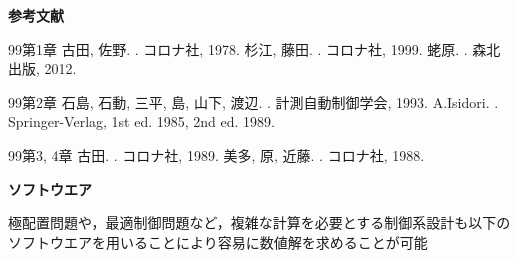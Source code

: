 \begin{center}
{\LARGE \bf 参考文献}
\end{center}

\begin{thebibliography}{99}{第1章}
  古田, 佐野.
	 .
	 \newblock コロナ社, 1978.
  杉江, 藤田.
	 .
	 \newblock コロナ社, 1999.
  蛯原.
	 .
	 \newblock 森北出版, 2012.
\end{thebibliography}
\begin{thebibliography}{99}{第2章}
  石島, 石動, 三平, 島, 山下, 渡辺.
	 . 
	 \newblock 計測自動制御学会, 1993.
  A.Isidori.
	 .
	 \newblock Springer-Verlag, 1st ed. 1985, 2nd ed. 1989.
\end{thebibliography}
\begin{thebibliography}{99}{第3, 4章}
  古田.
	 .
	 \newblock コロナ社, 1989.
  美多, 原, 近藤.
	 .
	 \newblock コロナ社, 1988.
\end{thebibliography}

\pagebreak

\begin{center}
{\LARGE \bf ソフトウエア}
\end{center}

極配置問題や，最適制御問題など，複雑な計算を必要とする制御系設計も以下のソフトウエアを用いることにより容易に数値解を求めることが可能

